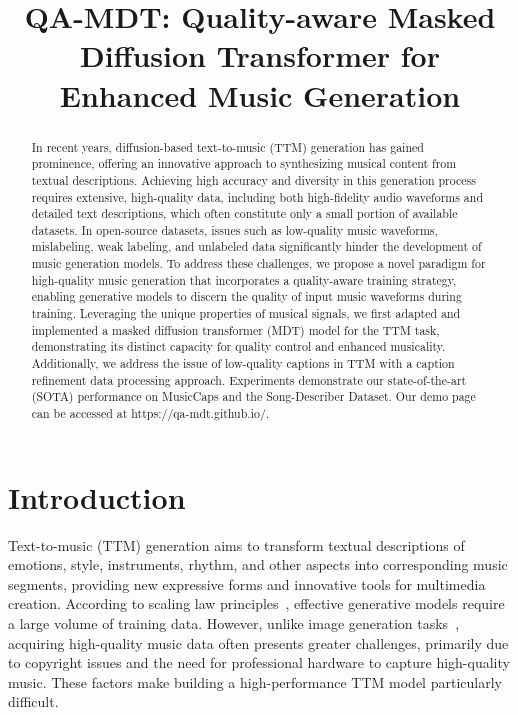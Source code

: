 \title{QA-MDT: Quality-aware Masked Diffusion Transformer for \\ Enhanced Music Generation}



\maketitle

\begin{abstract}
In recent years, diffusion-based text-to-music (TTM) generation has gained prominence, offering an innovative approach to synthesizing musical content from textual descriptions. Achieving high accuracy and diversity in this generation process requires extensive, high-quality data, including both high-fidelity audio waveforms and detailed text descriptions, which often constitute only a small portion of available datasets. In open-source datasets, issues such as low-quality music waveforms, mislabeling, weak labeling, and unlabeled data significantly hinder the development of music generation models.
To address these challenges, we propose a novel paradigm for high-quality music generation that incorporates a quality-aware training strategy, enabling generative models to discern the quality of input music waveforms during training. Leveraging the unique properties of musical signals, we first adapted and implemented a masked diffusion transformer (MDT) model for the TTM task, demonstrating its distinct capacity for quality control and enhanced musicality. Additionally, we address the issue of low-quality captions in TTM with a caption refinement data processing approach. Experiments demonstrate our state-of-the-art (SOTA) performance on MusicCaps and the Song-Describer Dataset.
Our demo page can be accessed at https://qa-mdt.github.io/.
\end{abstract}

\section{Introduction}
\renewcommand{\thefootnote}{}
Text-to-music (TTM) generation aims to transform textual descriptions of emotions, style, instruments, rhythm, and other aspects into corresponding music segments, providing new expressive forms and innovative tools for multimedia creation. According to scaling law principles~\citep{peebles2023scalable, li2024scalability}, effective generative models require a large volume of training data. However, unlike image generation tasks~\citep{chen2024pixart, rombach2021highresolution}, acquiring high-quality music data often presents greater challenges, primarily due to copyright issues and the need for professional hardware to capture high-quality music. These factors make building a high-performance TTM model particularly difficult.

